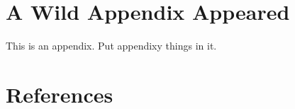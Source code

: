 \documentclass[12pt]{report} %
\begin{document}
\chapter{A Wild Appendix Appeared}
\thispagestyle{fancy} %

This is an appendix. Put appendixy things in it.





\chapter*{References}
\thispagestyle{fancy} %
\end{document}
